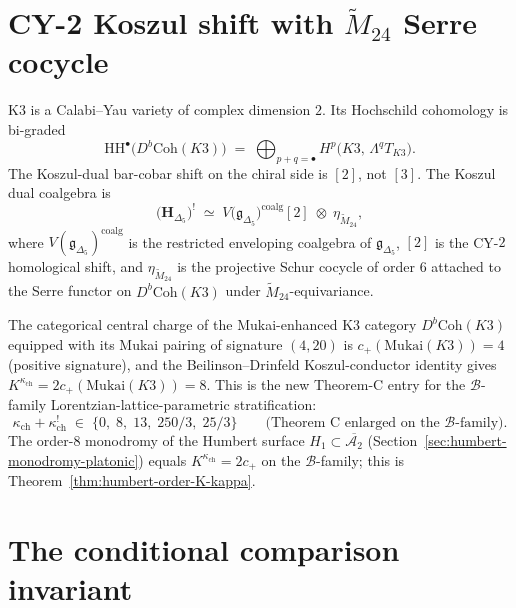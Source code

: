 \section{CY-2 Koszul shift with \texorpdfstring{$\widetilde{M}_{24}$}{widetildeM-24} Serre cocycle}
\label{sec:k3-cy2-serre-cocycle}

\begin{theorem}
\label{thm:k3-cy2-serre-cocycle}
K3 is a Calabi--Yau variety of complex dimension $2$. Its Hochschild cohomology is
bi-graded
\[
 \mathrm{HH}^\bullet\bigl(D^b\mathrm{Coh}(K3)\bigr)
 \;=\;
 \bigoplus_{p+q=\bullet} H^p\bigl(K3,\, \Lambda^q T_{K3}\bigr).
\]
The Koszul-dual bar-cobar shift on the chiral side is $[2]$, not $[3]$. The Koszul
dual coalgebra is
\[
 \bigl(\mathbf{H}_{\Delta_5}\bigr)^{!}
 \;\simeq\;
 V\bigl(\mathfrak{g}_{\Delta_5}\bigr)^{\mathrm{coalg}}[2]
 \;\otimes\;
 \eta_{\widetilde{M}_{24}},
\]
where $V(\mathfrak{g}_{\Delta_5})^{\mathrm{coalg}}$ is the restricted enveloping
coalgebra of $\mathfrak{g}_{\Delta_5}$, $[2]$ is the CY-$2$ homological shift, and
$\eta_{\widetilde{M}_{24}}$ is the projective Schur cocycle of order $6$ attached to
the Serre functor on $D^b\mathrm{Coh}(K3)$ under $\widetilde{M}_{24}$-equivariance.
\end{theorem}

\begin{remark}[Mukai doubling and \texorpdfstring{$K^{\kappa_{\mathrm{ch}}} = 8$}{K-kappa-ch = 8}]
\label{rem:mukai-doubling-K-kappa}
The categorical central charge of the Mukai-enhanced K3 category
$D^b\mathrm{Coh}(K3)$ equipped with its Mukai pairing of signature $(4,20)$ is
$c_+(\mathrm{Mukai}(K3))=4$ (positive signature), and the Beilinson--Drinfeld
Koszul-conductor identity gives $K^{\kappa_{\mathrm{ch}}} = 2c_+(\mathrm{Mukai}(K3))=8$.
This is the new Theorem-C entry for the $\mathcal{B}$-family
Lorentzian-lattice-parametric stratification:
\[
 \kappa_{\mathrm{ch}} + \kappa_{\mathrm{ch}}^!
 \;\in\;
 \{0,\; 8,\; 13,\; 250/3,\; 25/3\}
 \qquad\text{(Theorem~C enlarged on the $\mathcal{B}$-family)}.
\]
The order-$8$ monodromy of the Humbert surface $H_1\subset\overline{\mathcal{A}_2}$
(Section~\ref{sec:humbert-monodromy-platonic}) equals $K^{\kappa_{\mathrm{ch}}} = 2c_+$
on the $\mathcal{B}$-family; this is Theorem~\ref{thm:humbert-order-K-kappa}.
\end{remark}

\section{The conditional comparison invariant}
\label{sec:k3-classification-platonic}

